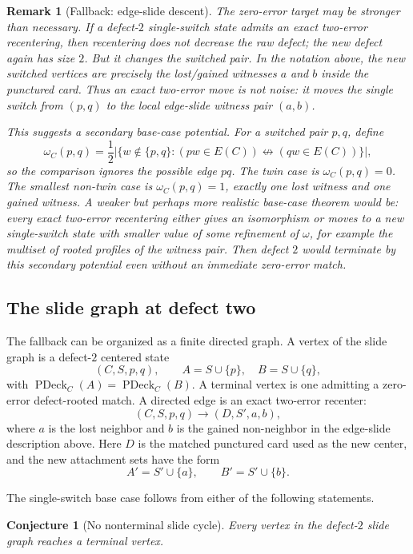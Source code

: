 \documentclass[11pt]{article}
\newtheorem{conjecture}{Conjecture}
\newtheorem{remark}{Remark}
\newcommand{\PDeck}{\operatorname{PDeck}}
\begin{document}
\begin{remark}[Fallback: edge-slide descent]
The zero-error target may be stronger than necessary.  If a defect-\(2\)
single-switch state admits an exact two-error recentering, then recentering
does not decrease the raw defect; the new defect again has size \(2\).  But it
changes the switched pair.  In the notation above, the new switched vertices
are precisely the lost/gained witnesses \(a\) and \(b\) inside the punctured
card.  Thus an exact two-error move is not noise: it moves the single switch
from \((p,q)\) to the local edge-slide witness pair \((a,b)\).

This suggests a secondary base-case potential.  For a switched pair \(p,q\),
define
\[
  \omega_C(p,q)
  =
  \frac{1}{2}
  \left|
    \{w\notin\{p,q\} :
      (pw\in E(C))\not\leftrightarrow(qw\in E(C))
    \}
  \right|,
\]
so the comparison ignores the possible edge \(pq\).  The twin case is
\(\omega_C(p,q)=0\).  The smallest non-twin case is
\(\omega_C(p,q)=1\), exactly one lost witness and one gained witness.  A
weaker but perhaps more realistic base-case theorem would be: every exact
two-error recentering either gives an isomorphism or moves to a new
single-switch state with smaller value of some refinement of \(\omega\), for
example the multiset of rooted profiles of the witness pair.  Then defect
\(2\) would terminate by this secondary potential even without an immediate
zero-error match.
\end{remark}

\subsection{The slide graph at defect two}

The fallback can be organized as a finite directed graph.  A vertex of the
slide graph is a defect-\(2\) centered state
\[
  (C,S,p,q),
  \qquad
  A=S\cup\{p\},\quad B=S\cup\{q\},
\]
with \(\PDeck_C(A)=\PDeck_C(B)\).  A terminal vertex is one admitting a
zero-error defect-rooted match.  A directed edge is an exact two-error
recenter:
\[
  (C,S,p,q)\longrightarrow (D,S',a,b),
\]
where \(a\) is the lost neighbor and \(b\) is the gained non-neighbor in the
edge-slide description above.  Here \(D\) is the matched punctured card used
as the new center, and the new attachment sets have the form
\[
  A'=S'\cup\{a\},
  \qquad
  B'=S'\cup\{b\}.
\]

The single-switch base case follows from either of the following statements.

\begin{conjecture}[No nonterminal slide cycle]
Every vertex in the defect-\(2\) slide graph reaches a terminal vertex.
\end{conjecture}
\end{document}
